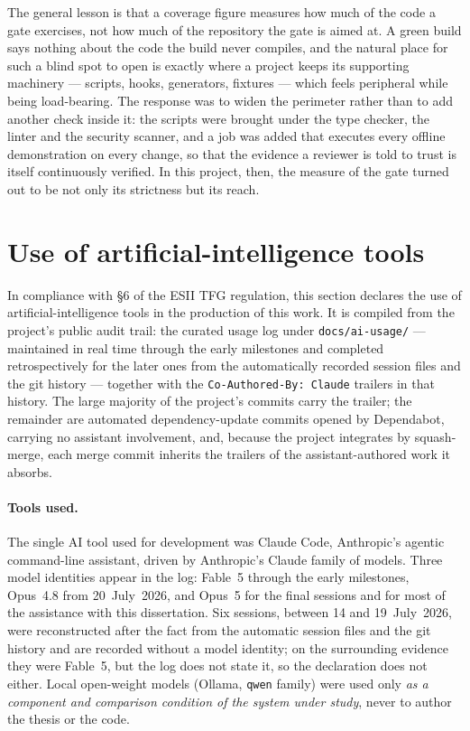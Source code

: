 The general lesson is that a coverage figure measures how much of the code a gate
exercises, not how much of the repository the gate is aimed at. A green build says
nothing about the code the build never compiles, and the natural place for such a
blind spot to open is exactly where a project keeps its supporting machinery ---
scripts, hooks, generators, fixtures --- which feels peripheral while being
load-bearing. The response was to widen the perimeter rather than to add another
check inside it: the scripts were brought under the type checker, the linter and the
security scanner, and a job was added that executes every offline demonstration on
every change, so that the evidence a reviewer is told to trust is itself
continuously verified. In this project, then, the measure of the gate turned out to
be not only its strictness but its reach.

\section{Use of artificial-intelligence tools}
\label{sec:ai-declaration}

In compliance with §6 of the ESII TFG regulation, this section declares the use of
artificial-intelligence tools in the production of this work. It is compiled from
the project's public audit trail: the curated usage log under
\texttt{docs/ai-usage/} --- maintained in real time through the early milestones and
completed retrospectively for the later ones from the automatically recorded session
files and the git history --- together with the \texttt{Co-Authored-By: Claude}
trailers in that history. The large majority of the project's commits carry the
trailer; the remainder are automated dependency-update commits opened by Dependabot,
carrying no assistant involvement, and, because the project integrates by
squash-merge, each merge commit inherits the trailers of the assistant-authored work
it absorbs.

\paragraph{Tools used.} The single AI tool used for development was Claude Code,
Anthropic's agentic command-line assistant, driven by Anthropic's Claude family of
models. Three model identities appear in the log: Fable~5 through the early
milestones, Opus~4.8 from 20~July~2026, and Opus~5 for the final sessions and for
most of the assistance with this dissertation. Six sessions, between 14 and
19~July~2026, were reconstructed after the fact from the automatic session files and
the git history and are recorded without a model identity; on the surrounding
evidence they were Fable~5, but the log does not state it, so the declaration does
not either. Local open-weight models
(Ollama, \texttt{qwen} family) were used only \emph{as a component and comparison
condition of the system under study}, never to author the thesis or the code.

